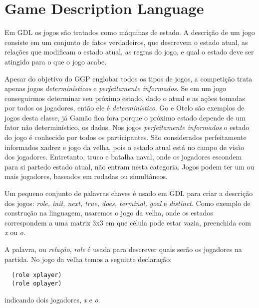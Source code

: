 \section{Game Description Language}
Em GDL os jogos são tratados como máquinas de estado. A descrição de um jogo
consiste em um conjunto de fatos verdadeiros, que descrevem o estado atual, as
relações que modificam o estado atual, as regras do jogo, e qual o estado deve
ser atingido para o que o jogo acabe.
 
Apesar do objetivo do GGP englobar todos os tipos de jogos, a competição trata
apenas jogos {\it determinísticos} e {\it perfeitamente informados}. Se em um
jogo conseguirmos determinar seu próximo estado, dado o atual e as ações tomadas
por todos os jogadores, então ele é {\it determinístico}. Go e Otelo são
exemplos de jogos desta classe, já Gamão fica fora porque o próximo estado
depende de um fator não determinístico, os dados. Nos jogos {\it perfeitamente
  informados}
o estado do jogo é conhecido por todos os participantes. São
considerados perfeitamente informados xadrez e jogo da velha, pois o estado
atual está no campo de visão dos jogadores. Entretanto, truco e batalha naval,
onde os jogadores escondem para si partedo estado atual, não entram nesta
categoria. Jogos podem ter um ou mais jogadores, baseados em rodadas ou
simultâneos.
 
Um pequeno conjunto de palavras chaves é usado em GDL para criar a descrição dos
jogos: {\it role, init, next, true, does, terminal, goal} e {\it distinct}.
Como exemplo de construção na linguagem, usaremos o jogo da velha, onde os
estados correspondem a uma matriz 3x3 em que célula pode estar vazia, preenchida
com {\it x} ou {\it o}.
 
A palavra, ou {\it relação}, {\it role} é usada para descrever quais serão os
jogadores na partida. No jogo da velha temos a seguinte declaração:
\begin{verbatim}
  (role xplayer)
  (role oplayer)
\end{verbatim}
indicando dois jogadores, {\it x} e {\it o}.
 
